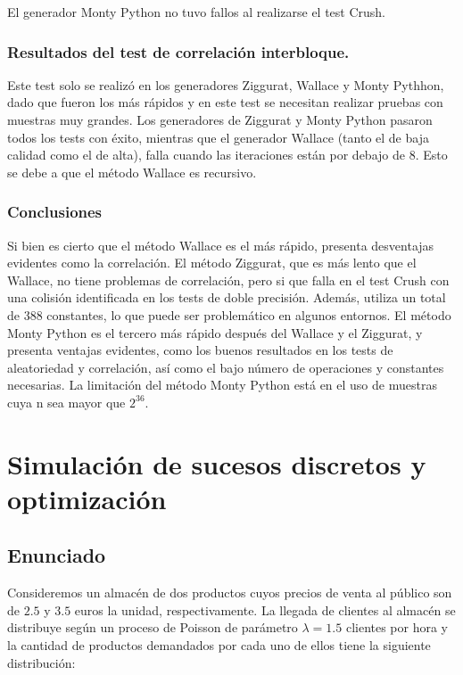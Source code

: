 \documentclass[a4paper,12pt]{article}
\begin{document}
	El generador Monty Python no tuvo fallos al realizarse el test Crush.
	
	\subsubsection{Resultados del test de correlación interbloque.}
	Este test solo se realizó en los generadores Ziggurat, Wallace y Monty Pythhon, dado que fueron los más rápidos y en este test se necesitan realizar pruebas con muestras muy grandes. Los generadores de Ziggurat y Monty Python pasaron todos los tests con éxito, mientras que el generador Wallace (tanto el de baja calidad como el de alta), falla cuando las iteraciones están por debajo de 8. Esto se debe a que el método Wallace es recursivo.
	
	
	\subsubsection{Conclusiones}
	
	Si bien es cierto que el método Wallace es el más rápido, presenta desventajas evidentes como la correlación. 
	El método Ziggurat, que es más lento que el Wallace, no tiene problemas de correlación, pero si que falla en el test Crush con una colisión identificada en los tests de doble precisión. 
	Además, utiliza un total de 388 constantes, lo que puede ser problemático en algunos entornos. 
	El método Monty Python es el tercero más rápido después del Wallace y el Ziggurat, y presenta ventajas evidentes, como los buenos resultados en los tests de aleatoriedad y correlación, así como el bajo número de operaciones y constantes necesarias. 
	La limitación del método Monty Python está en el uso de muestras cuya n sea mayor que  $2^{36}$. 
	
	
	
	
	
	
\newpage
	\section{Simulación de sucesos discretos y optimización}
	\subsection{Enunciado}
	Consideremos un almacén de dos productos cuyos precios de venta al público son de $2.5$ y $3.5$ euros la unidad, respectivamente. La llegada de clientes al almacén se distribuye según un proceso de Poisson de parámetro $\lambda = 1.5$ clientes por hora y la cantidad de productos demandados por cada uno de ellos tiene la siguiente distribución:
	
\end{document}
